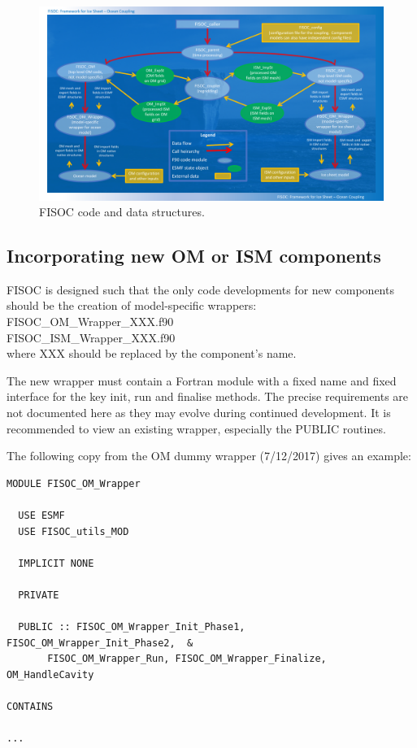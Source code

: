 \documentclass[12pt]{article}
\begin{document}
\begin{figure}[t]
  \vspace*{2mm}
  \begin{center}
    \includegraphics[width=17cm]{FISOC_structure2.pdf}
  \end{center}
  \caption{FISOC code and data structures.}
  \label{fig:codeStruct}
\end{figure}



\subsection{Incorporating new OM or ISM components}

FISOC is designed such that the only code developments for new components should be the creation 
of model-specific wrappers: \\
FISOC\_OM\_Wrapper\_XXX.f90 \\
 FISOC\_ISM\_Wrapper\_XXX.f90 \\
where XXX should be replaced by the component's name.

The new wrapper must contain a Fortran module with a fixed name 
and fixed interface for the key init, run and finalise methods. 
The precise requirements are not documented here as they may evolve 
during continued development.  
It is recommended to view an existing wrapper, especially the 
PUBLIC routines.

The following copy from the OM dummy wrapper (7/12/2017) gives 
an example:

\begin{lstlisting}
MODULE FISOC_OM_Wrapper

  USE ESMF
  USE FISOC_utils_MOD

  IMPLICIT NONE

  PRIVATE

  PUBLIC :: FISOC_OM_Wrapper_Init_Phase1,  FISOC_OM_Wrapper_Init_Phase2,  &
       FISOC_OM_Wrapper_Run, FISOC_OM_Wrapper_Finalize, OM_HandleCavity

CONTAINS

...
\end{lstlisting}
\end{document}
